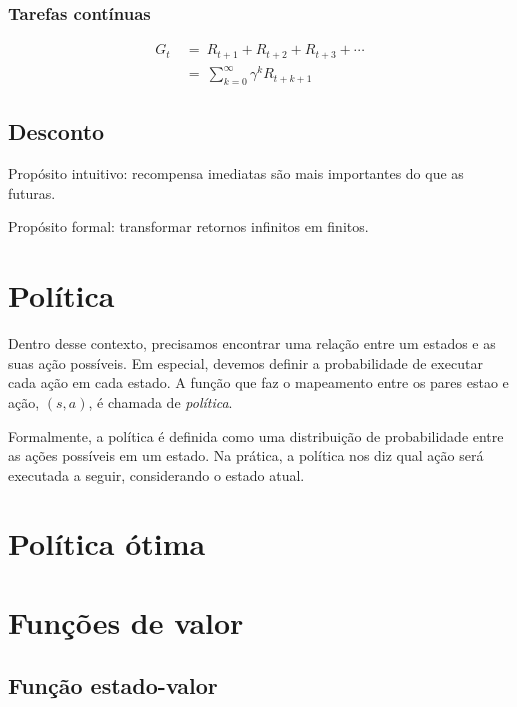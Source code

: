 \documentclass{article}
\begin{document}
            \subsubsection{Tarefas contínuas}
        
                \begin{equation}
                \begin{split}
                    G_t & \ = \ R_{t+1} + R_{t+2} + R_{t+3} + \cdots \\
                    & \ = \ \sum_{k=0}^{\infty} \gamma^k R_{t + k + 1}
                \end{split}
                \end{equation}
        
        \subsection{Desconto}
        
            Propósito intuitivo: recompensa imediatas são mais importantes do que as futuras.
            
            Propósito formal: transformar retornos infinitos em finitos.
        
    \section{Política}
    
        Dentro desse contexto, precisamos encontrar uma relação entre um estados e as suas ação possíveis. Em especial, devemos definir a probabilidade de executar cada ação em cada estado. A função que faz o mapeamento entre os pares estao e ação, $(s, a)$, é chamada de \emph{política}. 
        
        Formalmente, a política é definida como uma distribuição de probabilidade entre as ações possíveis em um estado. Na prática, a política nos diz qual ação será executada a seguir, considerando o estado atual.
    
        \section{Política ótima}
        
    
    \section{Funções de valor}
        
        \subsection{Função estado-valor}
        
\end{document}
